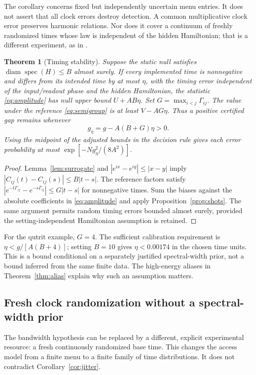 \documentclass[11pt,a4paper]{article}
\newtheorem{theorem}{Theorem}[section]
\theoremstyle{remark}\newtheorem{remark}[theorem]{Remark}
\newcommand{\diam}{\operatorname{diam}}
\begin{document}
The corollary concerns fixed but independently uncertain menu entries.
It does not assert that all clock errors destroy detection. A common
multiplicative clock error preserves harmonic relations. Nor does it
cover a continuum of freshly randomized times whose law is independent
of the hidden Hamiltonian; that is a different experiment, as in
\cite{parent,qutrit}.

\begin{theorem}[Timing stability]\label{thm:clock}
Suppose the static null satisfies
$\diam\operatorname{spec}(H)\leq B$ almost surely. If every implemented
time is nonnegative and differs from its intended time by at most $\eta$, with the timing
error independent of the input/readout phase and the hidden Hamiltonian,
the statistic
\eqref{eq:amplitude} has null upper bound $U+AB\eta$.
Set $G=\max_{i<j}\Gamma_{ij}$. The value under the reference
\eqref{eq:semigroup} is at least $V-AG\eta$.
Thus a positive certified gap remains whenever
\begin{equation}\label{eq:clockgap}
 g_\eta=g-A(B+G)\eta>0.
\end{equation}
Using the midpoint of the adjusted bounds in the decision rule gives
each error probability at most $\exp[-Ng_\eta^2/(8A^2)]$.
\end{theorem}
\begin{proof}
Lemma~\ref{lem:surrogate} and
$|e^{ix}-e^{iy}|\leq|x-y|$ imply
$|C_{ij}(t)-C_{ij}(s)|\leq B|t-s|$.
The reference factors satisfy
$|e^{-t\Gamma_{ij}}-e^{-s\Gamma_{ij}}|\leq G|t-s|$ for nonnegative
times. Sum the biases against the absolute coefficients in
\eqref{eq:amplitude} and apply Proposition~\ref{prop:shots}.
The same argument permits random timing errors bounded almost surely,
provided the setting-independent Hamiltonian assumption is retained.
\end{proof}

For the qutrit example, $G=4$. The sufficient calibration requirement is
$\eta<g/[A(B+4)]$; setting $B=10$ gives
$\eta<0.00174$ in the chosen time units. This is a bound conditional on
a separately justified spectral-width prior, not a bound inferred from
the same finite data. The high-energy aliases in
Theorem~\ref{thm:alias} explain why such an assumption matters.

\subsection{Fresh clock randomization without a spectral-width prior}
The bandwidth hypothesis can be replaced by a different, explicit
experimental resource: a fresh continuously randomized base time.
This changes the access model from a finite menu to a finite family of
time distributions. It does not contradict Corollary~\ref{cor:jitter}.
\end{document}
